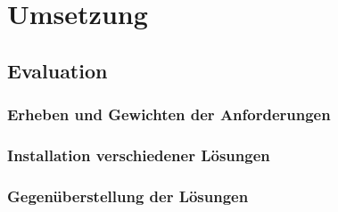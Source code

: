 
\clearpage
{}
\recalctypearea
\chapter{Umsetzung}
\section{Evaluation}

\clearpage
{}
\recalctypearea
\subsection{Erheben und Gewichten der Anforderungen}




\clearpage
{}
\recalctypearea
\subsection{Installation verschiedener Lösungen}






\clearpage
{}
\recalctypearea
\subsection{Gegenüberstellung der Lösungen}



